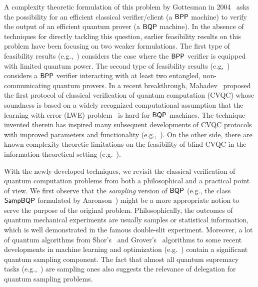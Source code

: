 A complexity theoretic formulation of this problem by Gottesman in 2004~\cite{web:Aaronson} asks the possibility for an efficient classical verifier/client (a $\operatorname{\mathsf{BPP}}$ machine) to verify the output of an
efficient quantum prover (a $\operatorname{\mathsf{BQP}}$ machine).
In the absence of techniques for directly tackling this question, earlier feasibility results on this problem have been focusing on two weaker formulations.
The first type of feasibility results (e.g.,~\cite{BFK09,arXiv:ABOEM17,FK17,mf16}) considers the case where the $\operatorname{\mathsf{BPP}}$ verifier is equipped with limited quantum power.
The second type of feasibility results (e.g,~\cite{Nat:RUV13, CGJV19, Gheorghiu_2015, HPF15})
considers a $\operatorname{\mathsf{BPP}}$ verifier interacting with at least two entangled, non-communicating quantum provers.
In a recent breakthrough, Mahadev~\cite{FOCS:Mahadev18a} proposed the first protocol of classical verification of quantum computation (CVQC) whose soundness is based on a widely recognized computational assumption that the learning with error (LWE) problem~\cite{JACM:Regev09} is hard for $\operatorname{\mathsf{BQP}}$ machines.
The technique invented therein has inspired many  subsequent developments of CVQC protocols with improved parameters and functionality (e.g.,~\cite{FOCS:GheVid19,arXiv:AlaChiHun19,arXiv:ChiaChungYam19}).
On the other side, there are known complexity-theoretic limitations on the feasibility of blind CVQC in the information-theoretical setting (e.g.~\cite{aaronson_et_al:LIPIcs:2019:10582}).

With the newly developed techniques, we revisit the classical verification of quantum computation problems from both a philosophical and a practical point of view.
We first observe that the \emph{sampling} version of $\operatorname{\mathsf{BQP}}$ (e.g., the class $\operatorname{\mathsf{SampBQP}}$ formulated by Aaronson~\cite{aaronson_2013}) might be a more appropriate notion to serve the purpose of the original problem.
Philosophically, the outcomes of quantum mechanical experiments are usually samples or statistical information, which is well demonstrated in the famous double-slit experiment.
Moreover, a lot of quantum algorithms from Shor's~\cite{Shor} and Grover's~\cite{Grover} algorithms to some recent developments in machine learning and optimization (e.g.~\cite{brando_et_al:LIPIcs:2019:10603, AGGW17,pmlr-v97-li19b}) contain a significant quantum sampling component.
The fact that almost all quantum supremacy tasks (e.g.,~\cite{Boson, IQP, nature-google}) are sampling ones also suggests the relevance of delegation for quantum sampling problems.

